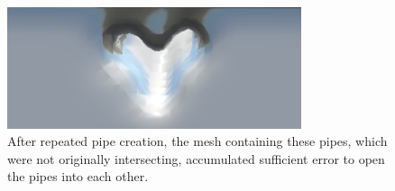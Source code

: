 \begin{figure}[h!]
\centering
    \includegraphics[width=3.4in]{figures/voxelize-fail.png}
\caption{After repeated pipe creation, the mesh containing these pipes, which were not originally intersecting, accumulated sufficient error to open the pipes into each other.}
\label{fig:voxelize}
\end{figure}